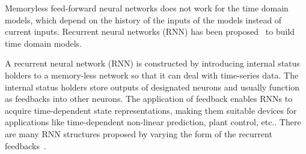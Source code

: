 
Memoryless feed-forward neural networks does not work for the time domain models, which depend on the
history of the inputs of the models instead of current inputs.
Recurrent neural networks (RNN) has been
proposed~\cite{rojas2013neural} to build time domain models.

A recurrent neural network (RNN) is constructed by introducing
internal status holders to a memory-less network so that it can deal
with time-series data. The internal status holders store outputs of
designated neurons and usually function as feedbacks into other
neurons. The application of feedback enables RNNs to acquire
time-dependent state representations, making them suitable devices for
applications like time-dependent non-linear prediction, plant control,
etc.\cite{haykin2004comprehensive}. There are many RNN structures
proposed by varying the form of the recurrent
feedbacks~\cite{haykin2004comprehensive,elman1990finding,puskorius1996dynamic}.
%
